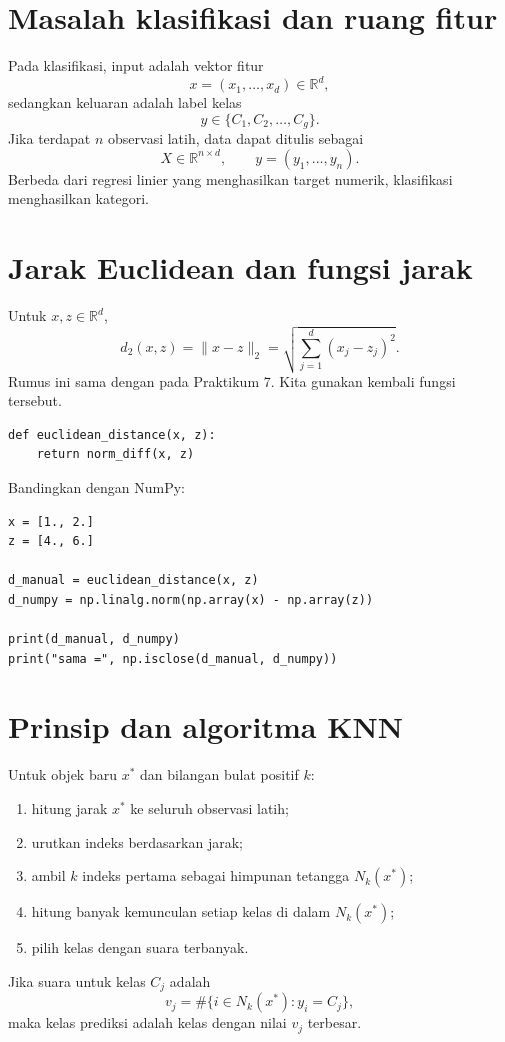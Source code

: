 \documentclass[11pt,a4paper]{report}
\newcommand{\kode}[1]{\texttt{\detokenize{#1}}}
\begin{document}
\section{Masalah klasifikasi dan ruang fitur}
Pada klasifikasi, input adalah vektor fitur
\[
x=(x_1,\ldots,x_d)\in\mathbb{R}^d,
\]
sedangkan keluaran adalah label kelas
\[
y\in\{C_1,C_2,\ldots,C_g\}.
\]
Jika terdapat $n$ observasi latih, data dapat ditulis sebagai
\[
X\in\mathbb{R}^{n\times d},
\qquad
y=(y_1,\ldots,y_n).
\]
Berbeda dari regresi linier yang menghasilkan target numerik, klasifikasi menghasilkan kategori.

\section{Jarak Euclidean dan fungsi jarak}
Untuk $x,z\in\mathbb{R}^d$,
\[
d_2(x,z)
=
\|x-z\|_2
=
\sqrt{\sum_{j=1}^{d}(x_j-z_j)^2}.
\]
Rumus ini sama dengan \kode{norm_diff} pada Praktikum 7. Kita gunakan kembali fungsi tersebut.
\begin{lstlisting}
def euclidean_distance(x, z):
    return norm_diff(x, z)
\end{lstlisting}

Bandingkan dengan NumPy:
\begin{lstlisting}
x = [1., 2.]
z = [4., 6.]

d_manual = euclidean_distance(x, z)
d_numpy = np.linalg.norm(np.array(x) - np.array(z))

print(d_manual, d_numpy)
print("sama =", np.isclose(d_manual, d_numpy))
\end{lstlisting}

\section{Prinsip dan algoritma KNN}
Untuk objek baru $x^*$ dan bilangan bulat positif $k$:
\begin{enumerate}
  \item hitung jarak $x^*$ ke seluruh observasi latih;
  \item urutkan indeks berdasarkan jarak;
  \item ambil $k$ indeks pertama sebagai himpunan tetangga $N_k(x^*)$;
  \item hitung banyak kemunculan setiap kelas di dalam $N_k(x^*)$;
  \item pilih kelas dengan suara terbanyak.
\end{enumerate}

Jika suara untuk kelas $C_j$ adalah
\[
v_j=\#\{i\in N_k(x^*):y_i=C_j\},
\]
maka kelas prediksi adalah kelas dengan nilai $v_j$ terbesar.
\end{document}
